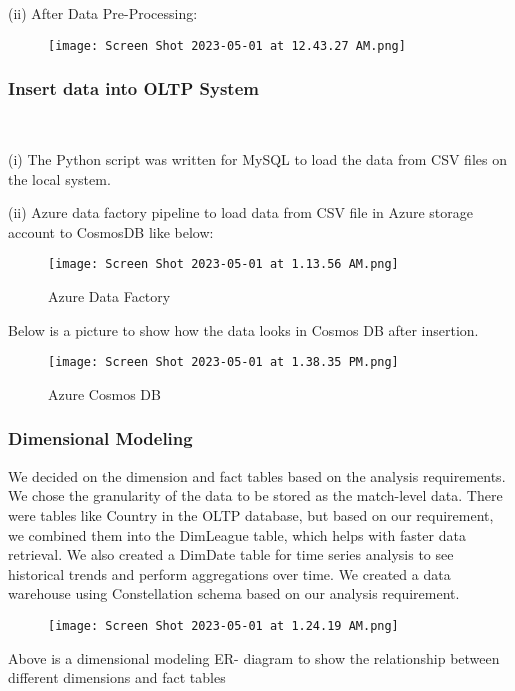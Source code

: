 \documentclass[lettersize]{IEEEtran}
\begin{document}
\vspace{-1\baselineskip}
(ii) After Data Pre-Processing:
\begin{figure}[H]
    \centering
    \texttt{[image: Screen Shot 2023-05-01 at 12.43.27 AM.png]}
\end{figure}
\vspace{-1\baselineskip}
\subsubsection{\textbf{Insert data into OLTP System}}\vspace{0.5em}
\

\vspace{0.5em}(i) The Python script was written for MySQL to load the data from CSV files on the local system.

(ii) Azure data factory pipeline to load data from CSV file in Azure storage account to CosmosDB like below:

\begin{figure}[H]
    \centering
    \texttt{[image: Screen Shot 2023-05-01 at 1.13.56 AM.png]}
    \caption{Azure Data Factory}
    \label{fig:image_label}
\end{figure}

Below is a picture to show how the data looks in Cosmos DB after insertion.
\vspace{-2\baselineskip}
\begin{figure}[H]
    \centering
    \texttt{[image: Screen Shot 2023-05-01 at 1.38.35 PM.png]}
    \caption{Azure Cosmos DB}
    \label{fig:image_label}
\end{figure}
\vspace{-2\baselineskip}
\subsubsection{\textbf{Dimensional Modeling}}
We decided on the dimension and fact tables based on the analysis requirements. We chose the granularity of the data to be stored as the match-level data. There were tables like Country in the OLTP database, but based on our requirement, we combined them into the DimLeague table, which helps with faster data retrieval. We also created a DimDate table for time series analysis to see historical trends and perform aggregations over time. We created a data warehouse using Constellation schema based on our analysis requirement.
\begin{figure}[H]
    \centering
    \texttt{[image: Screen Shot 2023-05-01 at 1.24.19 AM.png]}
\end{figure}
\vspace{-0.5\baselineskip}
Above is a dimensional modeling ER- diagram to show the relationship between different dimensions and fact tables\vspace{0.5em}
\end{document}
